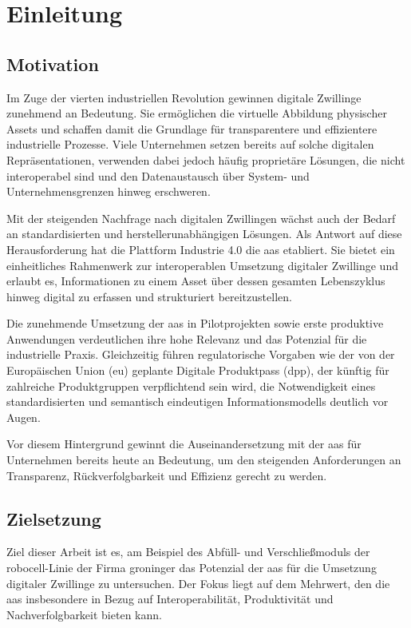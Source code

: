 \thispagestyle{fancy}
\section{Einleitung}
\subsection{Motivation}
\label{sec:Motivation}
Im Zuge der vierten industriellen Revolution gewinnen digitale Zwillinge zunehmend an Bedeutung. 
Sie ermöglichen die virtuelle Abbildung physischer Assets und schaffen damit die Grundlage für transparentere und effizientere industrielle Prozesse. 
Viele Unternehmen setzen bereits auf solche digitalen Repräsentationen, verwenden dabei jedoch häufig proprietäre Lösungen, die nicht interoperabel sind und den Datenaustausch über System- und Unternehmensgrenzen hinweg erschweren.

Mit der steigenden Nachfrage nach digitalen Zwillingen wächst auch der Bedarf an standardisierten und herstellerunabhängigen Lösungen. 
Als Antwort auf diese Herausforderung hat die Plattform Industrie 4.0 die \ac{aas} etabliert. 
Sie bietet ein einheitliches Rahmenwerk zur interoperablen Umsetzung digitaler Zwillinge und erlaubt es, Informationen zu einem Asset über dessen gesamten Lebenszyklus hinweg digital zu erfassen und strukturiert bereitzustellen.

Die zunehmende Umsetzung der \acs{aas} in Pilotprojekten sowie erste produktive Anwendungen verdeutlichen ihre hohe Relevanz und das Potenzial für die industrielle Praxis. 
Gleichzeitig führen regulatorische Vorgaben wie der von der Europäischen Union (\acs{eu}) geplante Digitale Produktpass (\acs{dpp}), der künftig für zahlreiche Produktgruppen verpflichtend sein wird, die Notwendigkeit eines standardisierten und semantisch eindeutigen Informationsmodells deutlich vor Augen.

Vor diesem Hintergrund gewinnt die Auseinandersetzung mit der \acs{aas} für Unternehmen bereits heute an Bedeutung, um den steigenden Anforderungen an Transparenz, Rückverfolgbarkeit und Effizienz gerecht zu werden.

\subsection{Zielsetzung}

Ziel dieser Arbeit ist es, am Beispiel des Abfüll- und Verschließmoduls der robocell-Linie der Firma groninger das Potenzial der \acs{aas} für die Umsetzung digitaler Zwillinge zu untersuchen. 
Der Fokus liegt auf dem Mehrwert, den die \acs{aas} insbesondere in Bezug auf Interoperabilität, Produktivität und Nachverfolgbarkeit bieten kann. 

